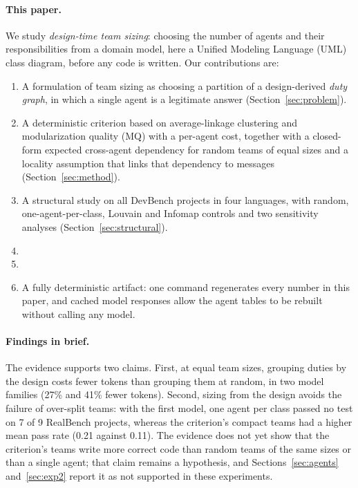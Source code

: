 \paragraph{This paper.} We study \emph{design-time team sizing}: choosing the number of agents and their responsibilities from a domain model, here a Unified Modeling Language (UML) class diagram, before any code is written. Our contributions are:
\begin{enumerate}
\item A formulation of team sizing as choosing a partition of a design-derived \emph{duty graph}, in which a single agent is a legitimate answer (Section~\ref{sec:problem}).
\item A deterministic criterion based on average-linkage clustering and modularization quality (MQ) with a per-agent cost, together with a closed-form expected cross-agent dependency for random teams of equal sizes and a locality assumption that links that dependency to messages (Section~\ref{sec:method}).
\item A structural study on all \NProjects DevBench projects in four languages, with random, one-agent-per-class, Louvain and Infomap controls and two sensitivity analyses (Section~\ref{sec:structural}).
\item \ContributionFour
\item \ExpTwoContribution
\item A fully deterministic artifact: one command regenerates every number in this paper, and cached model responses allow the agent tables to be rebuilt without calling any model.
\end{enumerate}

\paragraph{Findings in brief.} The evidence supports two claims. First, at equal team sizes, grouping duties by the design costs fewer tokens than grouping them at random, in two model families (27\% and 41\% fewer tokens). Second, sizing from the design avoids the failure of over-split teams: with the first model, one agent per class passed no test on 7 of 9 RealBench projects, whereas the criterion's compact teams had a higher mean pass rate (0.21 against 0.11). The evidence does not yet show that the criterion's teams write more correct code than random teams of the same sizes or than a single agent; that claim remains a hypothesis, and Sections~\ref{sec:agents} and~\ref{sec:exp2} report it as not supported in these experiments.

